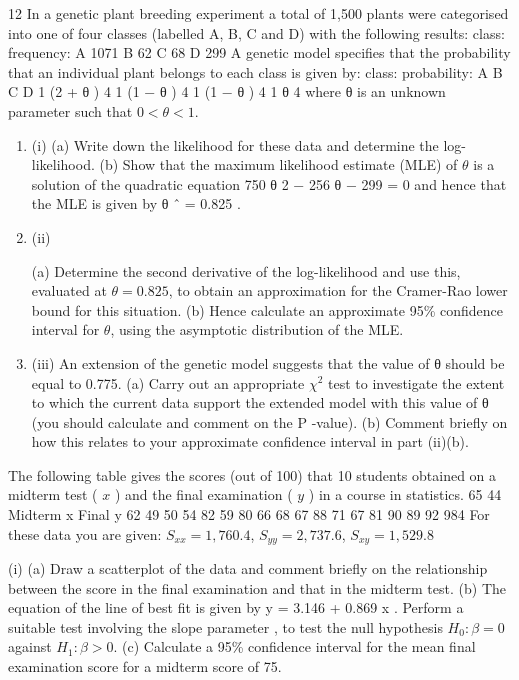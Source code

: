 \documentclass[a4paper,12pt]{article}
\begin{document}

12
In a genetic plant breeding experiment a total of 1,500 plants were categorised into one of four classes (labelled A, B, C and D) with the following results:
class:
frequency:
A
1071
B
62
C
68
D
299
A genetic model specifies that the probability that an individual plant belongs to each
class is given by:
class:
probability:
A B C D
1
(2 + θ )
4 1
(1 − θ )
4 1
(1 − θ )
4 1
θ
4
where θ is an unknown parameter such that $0 < \theta < 1$.
\begin{enumerate}
\item (i)
(a) Write down the likelihood for these data and determine the log-likelihood.
(b) Show that the maximum likelihood estimate (MLE) of $\theta$ is a solution of the quadratic equation
750 θ 2 − 256 θ − 299 = 0
and hence that the MLE is given by θ ˆ = 0.825 .
\item  (ii)


(a) Determine the second derivative of the log-likelihood and use this, evaluated at $\theta = 0.825$, to obtain an approximation for the Cramer-Rao lower bound for this situation.
(b) Hence calculate an approximate 95\% confidence interval for $\theta$, using the asymptotic distribution of the MLE.
\item (iii)
An extension of the genetic model suggests that the value of θ should be equal to 0.775.
(a) Carry out an appropriate $\chi^2$ test to investigate the extent to which the current data support the extended model with this value of θ (you should calculate and comment on the P -value).
(b) Comment briefly on how this relates to your approximate confidence interval in part (ii)(b).
\end{enumerate}
The following table gives the scores (out of 100) that 10 students obtained on a midterm test ( $x$ ) and the final examination ( $y$ ) in a course in statistics.
65
44
Midterm x
Final y
62
49
50
54
82
59
80
66
68
67
88
71
67
81
90
89
92
984
For these data you are given: $S_{xx} = 1,760.4$, $S_{yy} = 2,737.6$, $S_{xy} = 1,529.8$
\item (i)
(a) Draw a scatterplot of the data and comment briefly on the relationship between the score in the final examination and that in the midterm test.
(b) The equation of the line of best fit is given by y = 3.146 + 0.869 x . Perform a suitable test involving the slope parameter \beta, to test the null hypothesis $H_0 : \beta = 0$ against $H_1 : \beta > 0$.
(c) Calculate a 95\% confidence interval for the mean final examination score for a midterm score of 75.
\end{document}
